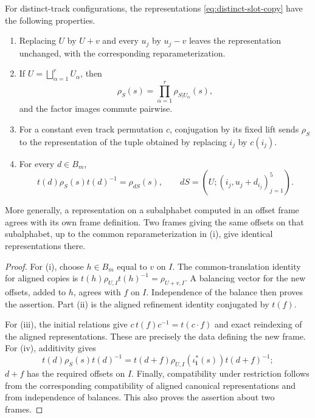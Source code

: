 \begin{lemma}\label{lem:slot-frames}
For distinct-track configurations, the representations
\eqref{eq:distinct-slot-copy} have the following properties.
\begin{enumerate}[label=\textup{(\roman*)}]
\item Replacing $U$ by $U+v$ and every $u_j$ by $u_j-v$ leaves the
representation unchanged, with the corresponding reparameterization.
\item If $U=\bigsqcup_{\alpha=1}^r U_\alpha$, then
\begin{equation}
 \rho_S(s)=\prod_{\alpha=1}^r\rho_{S|U_\alpha}(s),
 \label{eq:slot-refinement-distinct}
\end{equation}
and the factor images commute pairwise.
\item For a constant even track permutation $c$, conjugation by its fixed
lift sends $\rho_S$ to the representation of the tuple obtained by
replacing $i_j$ by $c(i_j)$.
\item For every $d\in B_m$,
\begin{equation}
 t(d)\rho_S(s)t(d)^{-1}=\rho_{dS}(s),
 \qquad
 dS=(U;(i_j,u_j+d_{i_j})_{j=1}^5).
 \label{eq:distinct-translation}
\end{equation}
\end{enumerate}
More generally, a representation on a subalphabet computed in an offset
frame agrees with its own frame definition.  Two frames giving the same
offsets on that subalphabet, up to the common reparameterization in
\textup{(i)}, give identical representations there.
\end{lemma}

\begin{proof}
For (i), choose $h\in B_m$ equal to $v$ on $I$.  The common-translation
identity for aligned copies is
$t(h)\rho_{U,I}t(h)^{-1}=\rho_{U+v,I}$.  A balancing vector for the new
offsets, added to $h$, agrees with $f$ on $I$.  Independence of the balance
then proves the assertion.  Part (ii) is the aligned refinement identity
conjugated by $t(f)$.

For (iii), the initial relations give
$c\,t(f)c^{-1}=t(c\cdot f)$ and exact reindexing of the aligned
representations.  These are precisely the data defining the new frame.
For (iv), additivity gives
\[
 t(d)\rho_S(s)t(d)^{-1}
 =t(d+f)\rho_{U,I}(\iota_{\boldsymbol i}^\ast(s))t(d+f)^{-1};
\]
$d+f$ has the required offsets on $I$.  Finally, compatibility under
restriction follows from the corresponding compatibility of aligned
canonical representations and from independence of balances.  This also
proves the assertion about two frames.
\end{proof}

